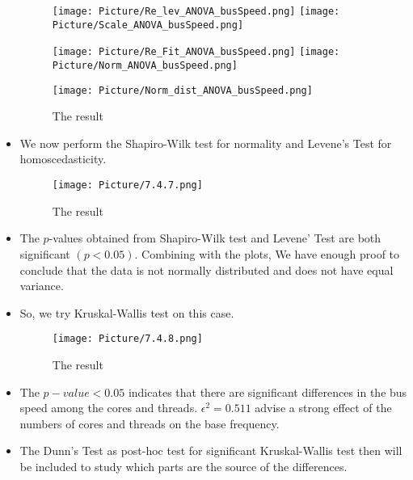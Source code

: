 \documentclass[a4paper]{article}
\begin{document}
\begin{itemize}
    \begin{figure}[H]
        \centering
        \texttt{[image: Picture/Re\_lev\_ANOVA\_busSpeed.png]}
        \texttt{[image: Picture/Scale\_ANOVA\_busSpeed.png]}
        \label{7.4.4}
    \end{figure}
    
    \begin{figure}[H]
        \centering
        \texttt{[image: Picture/Re\_Fit\_ANOVA\_busSpeed.png]}
        \texttt{[image: Picture/Norm\_ANOVA\_busSpeed.png]}
        \label{7.4.5}
    \end{figure}
    
    \begin{figure}[H]
        \centering
        \texttt{[image: Picture/Norm\_dist\_ANOVA\_busSpeed.png]}
        \caption{The result}
        \label{7.4.6}
    \end{figure}
    
    \item[] We now perform the Shapiro-Wilk test for normality and Levene's Test for homoscedasticity.
    
    \begin{figure}[H]
        \centering
        \texttt{[image: Picture/7.4.7.png]}
        \caption{The result}
        \label{7.4.7}
    \end{figure}
    
    \item[] The $p$-values obtained from Shapiro-Wilk test and Levene' Test are both significant $(p<0.05)$. Combining with the plots, We have enough proof to conclude that the data is not normally distributed and does not have equal variance.
    
    \item[] So, we try Kruskal-Wallis test on this case.
    
    \begin{figure}[H]
        \centering
        \texttt{[image: Picture/7.4.8.png]}
        \caption{The result}
        \label{7.4.8}
    \end{figure}
    
    \item[] The $p-value < 0.05$ indicates that there are significant differences in the bus speed among the cores and threads. $\epsilon^2 = 0.511$ advise a strong effect of the numbers of cores and threads on the base frequency.
    
    \item[] The Dunn's Test as post-hoc test for significant Kruskal-Wallis test then will be included to study which parts are the source of the differences.


\end{itemize}
\end{document}
